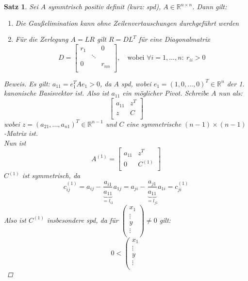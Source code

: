 \documentclass[12pt]{article}
\theoremstyle{break}
\newtheorem{theorem}{Satz}[subsection]
\begin{document}
\begin{theorem}
Sei $A$ symmtrisch positiv definit (kurz: spd), $A \in \mathbb{R}^{n\times n}$. Dann gilt:
\begin{enumerate}
  \item[i)] Die Gaußelimination kann ohne Zeilenvertauschungen durchgeführt werden
  \item[ii)] Für die Zerlegung $A=LR$ gilt $R = DL^T$ für eine Diagonalmatrix 
  $$D =
  \begin{bmatrix}
  r_1 && 0 \\
  & \ddots \\
  0 && r_{nn} \\
  \end{bmatrix}, \quad \text{wobei }\forall i = 1,...,n: \medspace r_{ii} > 0$$ 
\end{enumerate}
\begin{proof}[Beweis]
Es gilt: $a_{11} = e_{1}^T A e_1 > 0$, da $A$ spd, wobei $e_1 = (1,0,...,0)^T \in \mathbb{R}^n$ der 1. kanonische Basisvektor ist. Also ist $a_{11}$ ein möglicher Pivot. Schreibe $A$ nun als:
$$\left[
\begin{array}{c|c}
a_{11} & z^T \\
\hline
z & C \\
\end{array}
\right]$$
wobei $z = (a_{21}, ..., a_{n1})^T \in \mathbb{R}^{n-1}$ und $C$ eine symmetrische $(n-1)\times(n-1)$-Matrix ist. \\
Nun ist 
$$A^{(1)} = \left[
\begin{array}{c|c}
a_{11} & z^T \\
\hline
0 & C^{(1)} \\
\end{array}
\right]$$
$C^{(1)}$ ist symmetrisch, da 
$$c_{ij}^{(1)} = a_{ij} - \underbrace{\frac{a_{i1}}{a_{11}}}_{= l_{i1}} a_{1j} = a_{ji} - \underbrace{\frac{a_{j1}}{a_{11}}}_{= l_{j1}} a_{1i} = c_{ji}^{(1)}$$
Also ist $C^{(1)}$ insbesondere spd, da für 
$\left(
\begin{array}{c}
x_1 \\
\hline
\vdots \\
y \\
\vdots \\
\end{array}
\right) \neq 0 $ gilt:
$$ 0 < 
\left(
\begin{array}{c}
x_1 \\
\hline
\vdots \\
y \\
\vdots \\

\end{array}$$
\end{proof}
\end{theorem}
\end{document}
